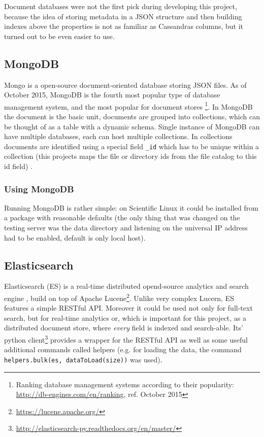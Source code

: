 Document databases were not the first pick during developing this project, because the idea of
storing metadata in a JSON structure and then building indexes above the properties is not as
familiar as Cassandras columns, but it turned out to be even easier to use.

\subsection{MongoDB}

Mongo is a open-source document-oriented database storing JSON files. As of October 2015, MongoDB is the fourth 
most popular type of database management system, and the most popular for document stores 
\footnote{Ranking database management systems according to their popularity: \url{http://db-engines.com/en/ranking}, ref. October 2015}. 
In MongoDB the document is the basic unit, documents are grouped into collections, which can be thought of as 
a table with a dynamic schema. Single instance of MongoDB can have multiple databases, each can host multiple 
collections. In collections documents are identified using a special field \texttt{\_id} which has to be unique
within a collection (this projects maps the file or directory ids from the file catalog to this id field) \cite{MongoBook}.

\subsubsection{Using MongoDB}

Running MongoDB is rather simple: on Scientific Linux it could be installed from a package with reasonable 
defaults (the only thing that was changed on the testing server was the data directory and listening on the 
universal IP address had to be enabled, default is only local host). %

\subsection{Elasticsearch}

Elasticsearch (ES) is a real-time distributed opend-source analytics and search engine \cite{ESBook}, 
build on top of Apache Lucene\footnote{\url{https://lucene.apache.org/}}. Unlike very complex Lucern, 
ES features a simple RESTful API. Moreover it could be used not only for full-text search, but for real-time
analytics or, which is important for this project, as a distributed document store, where \textit{every} field
is indexed and search-able. Its' python 
client\footnote{\url{http://elasticsearch-py.readthedocs.org/en/master/}} provides a wrapper for the RESTful API
as well as some useful additional commands called helpers (e.g. for loading the data, the command 
\texttt{helpers.bulk(es, dataToLoad(size))} was used).

